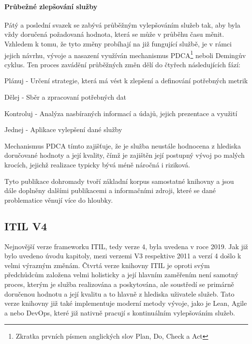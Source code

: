 \documentclass[
  digital,     %
  twoside,     %
  lof,         %
  lot,         %
]{fithesis4}
\begin{document}
\paragraph{Průbežné zlepšování služby}
Pátý a poslední svazek se zabývá průběžným vylepšováním služeb tak, aby byla vždy doručená požadovaná hodnota, která se může v průběhu času měnit. Vzhledem k tomu, že tyto změny probíhají na již fungující službě, je v rámci jejich návrhu, vývoje a nasazení využíván mechanismus PDCA\footnote{Zkratka prvních písmen anglických slov Plan, Do, Check a Act} neboli Demingův cyklus. Ten proces zavádění průběžných změn dělí do čtyřech následujících fází: \parencite[s.~38]{Matula2017}
\begin{compactitem}
    \item Plánuj - Určení strategie, která má vést k zlepšení a definování potřebných metrik
    \item Dělej - Sběr a zpracovaní potřebných dat
    \item Kontroluj - Analýza nasbíraných informací a údajů, jejich prezentace a využití
    \item Jednej - Aplikace vylepšení dané služby
\end{compactitem}
Mechanismus PDCA tímto zajišťuje, že je služba neustále hodnocena z hlediska doručované hodnoty a její kvality, čímž je zajištěn její postupný vývoj po malých krocích, jejichž realizace typicky bývá méně náročná i riziková. 

Tyto publikace dohromady tvoří základní korpus samostatné knihovny a jsou dále doplněny dalšími publikacemi a informačními zdroji, které se dané problematice věnují více do hloubky. \parencite[s.~8]{Carlidge2007}

\subsection{ITIL V4}
Nejnovější verze frameworku ITIL, tedy verze 4, byla uvedena v roce 2019. Jak již bylo uvedeno úvodu kapitoly, mezi verzemi V3 respektive 2011 a verzí 4 došlo k velmi výrazným změnám. Čtvrtá verze knihovny ITIL je oproti svým předchůdcům založena velmi holisticky a její hlavním zaměřením není samotný proces, kterým je služba realizována a poskytována, ale soustředí se primárně doručenou hodnotu a její kvalitu a to hlavně z hlediska uživatele služeb. Tato verze knihovny již také implementuje moderní metody vývoje, jako je Lean, Agile a nebo DevOps, které již nativně pracují s kontinuálním vylepšováním služeb. \parencite[s.~7]{Cartlidge2020}
\end{document}
